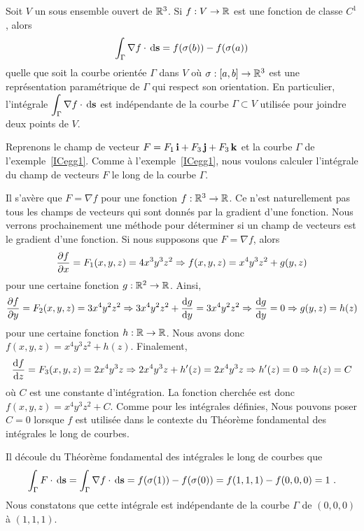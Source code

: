 {\begin{focus}{\thm}
Soit $V$ un sous ensemble ouvert de $\mathbb{R}^3$.  Si $f:V \rightarrow \mathbb{R}$ est
une fonction de classe $C^1$, alors
\[
\int_\Gamma \nabla f \cdot \,\mathrm{d}\mathbf{s} = f(\sigma(b)) - f(\sigma(a))
\]
quelle que soit la courbe orientée $\Gamma$ dans $V$ où
$\sigma:[a,b]\to \mathbb{R}^3$ est une représentation paramétrique de
$\Gamma$ qui respect son orientation.  En particulier,
l'intégrale $\displaystyle \int_\Gamma \nabla f \cdot \,\mathrm{d}\mathbf{s}$
est indépendante de la courbe $\Gamma \subset V$ utilisée pour joindre
deux points de $V$.
\end{focus}

\begin{egg}
Reprenons le champ de vecteur $F = F_1\,\mathbf{i} + F_3\,\mathbf{j}+F_3\,\mathbf{k}$
et la courbe $\Gamma$ de l'exemple~\ref{ICegg1}.  Comme à
l'exemple~\ref{ICegg1}, nous voulons calculer l'intégrale du champ de
vecteurs $F$ le long de la courbe $\Gamma$.

Il s'avère que $F = \nabla f$ pour une fonction $f:\mathbb{R}^3 \to \mathbb{R}$.
Ce n'est naturellement pas tous les champs de vecteurs qui sont donnés
par la gradient d'une fonction.  Nous verrons prochainement une méthode
pour déterminer si un champ de vecteurs est le gradient d'une
fonction.   Si nous supposons que $F = \nabla f$, alors
\[
  \frac{\partial f}{\partial x} = F_1(x,y,z) = 4x^3y^3z^2 \Rightarrow f(x,y,z) = x^4 y^3 z^2 +
  g(y,z)
\]
pour une certaine fonction $g:\mathbb{R}^2 \to \mathbb{R}$.  Ainsi,
\[
  \frac{\partial f}{\partial y} = F_2(x,y,z) = 3x^4y^2z^2 \Rightarrow
  3x^4y^2z^2 + \frac{\mathrm{d}g}{\mathrm{d}y} = 3x^4y^2z^2 \Rightarrow
  \frac{\mathrm{d}g}{\mathrm{d}y} = 0 \Rightarrow g(y,z) = h(z)
\]
pour une certaine fonction $h:\mathbb{R} \to \mathbb{R}$.  Nous avons donc
$f(x,y,z) = x^4 y^3 z^2 + h(z)$.  Finalement,
\[
  \frac{\mathrm{d}f}{\mathrm{d}z} = F_3(x,y,z) = 2x^4y^3z \Rightarrow
  2x^4y^3z + h'(z) = 2x^4y^3z \Rightarrow h'(z) = 0
  \Rightarrow h(z) = C
\]
où $C$ est une constante d'intégration.  La fonction cherchée est donc
$f(x,y,z) = x^4 y^3 z^2 + C$.  Comme pour les intégrales
définies, Nous pouvons poser $C=0$ lorsque $f$ est utilisée dans le
contexte du Théorème fondamental des intégrales le long de courbes.

Il découle du Théorème fondamental des intégrales le long de courbes que
\[
  \int_{\Gamma} F \cdot \,\mathrm{d}\mathbf{s}
  = \int_{\Gamma} \nabla f \cdot \,\mathrm{d}\mathbf{s}
  =f(\sigma(1)) - f(\sigma(0)) = f(1,1,1)-f(0,0,0) = 1 \ .
\]
Nous constatons que cette intégrale est indépendante de la courbe
$\Gamma$ de $(0,0,0)$ à $(1,1,1)$.
\end{egg}

}
